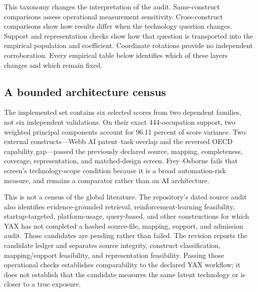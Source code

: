 This taxonomy changes the interpretation of the audit.  Same-construct
comparisons assess operational measurement sensitivity.  Cross-construct
comparisons show how results differ when the technology question changes.
Support and representation checks show how that question is transported into
the empirical population and coefficient.  Coordinate rotations provide no
independent corroboration.  Every empirical table below identifies which of
these layers changes and which remain fixed.

\subsection{A bounded architecture census}
\label{sec:architecture-census}

The implemented set contains six selected scores from two dependent families,
not six independent validations.  On their exact 444-occupation support, two
weighted principal components account for 96.11 percent of score variance.
Two external constructs---Webb AI patent--task overlap and the reversed OECD
capability gap---passed the previously declared source, mapping, completeness,
coverage, representation, and matched-design screen.  Frey--Osborne fails that
screen's technology-scope condition because it is a broad automation-risk
measure, and remains a comparator rather than an AI architecture.

This is not a census of the global literature.  The repository's dated source
audit also identifies evidence-grounded retrieval, reinforcement-learning
feasibility, startup-targeted, platform-usage, query-based, and other
constructions for which YAX has not completed a hashed source-file, mapping,
support, and admission audit.  Those candidates are pending rather than failed.
The revision reports the candidate ledger and separates source integrity,
construct classification, mapping/support feasibility, and representation
feasibility.  Passing those operational checks establishes comparability to the
declared YAX workflow; it does not establish that the candidate measures the
same latent technology or is closer to a true exposure.
